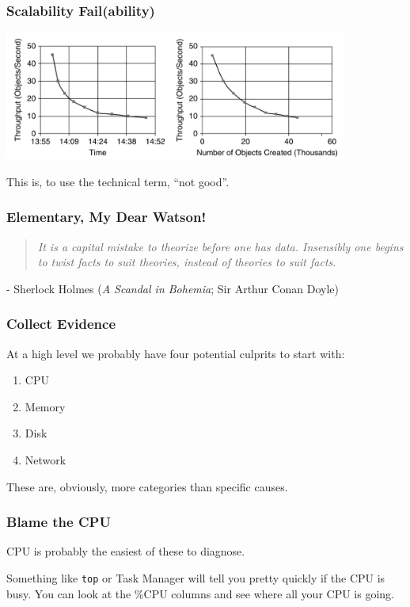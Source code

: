\begin{frame}
\frametitle{Scalability Fail(ability)}

\begin{center}
	\includegraphics[width=0.85\textwidth]{images/batch-job-scalability.png}
\end{center}

This is, to use the technical term, ``not good''.

\end{frame}



\begin{frame}
\frametitle{Elementary, My Dear Watson!}

\begin{quote}
\textit{It is a capital mistake to theorize before one has data. Insensibly one begins to twist facts to suit theories, instead of theories to suit facts.}
\end{quote}
\hfill - Sherlock Holmes (\textit{A Scandal in Bohemia}; Sir Arthur Conan Doyle)

\end{frame}



\begin{frame}
\frametitle{Collect Evidence}

At a high level we probably have four potential culprits to start with:
\begin{enumerate}
	\item CPU
	\item Memory
	\item Disk
	\item Network
\end{enumerate}

These are, obviously, more categories than specific causes.

\end{frame}



\begin{frame}
\frametitle{Blame the CPU}

CPU is probably the easiest of these to diagnose. 

Something like \texttt{top} or Task Manager will tell you pretty quickly if the CPU is busy. You can look at the \%CPU columns and see where all your CPU is going. 



\end{frame}



